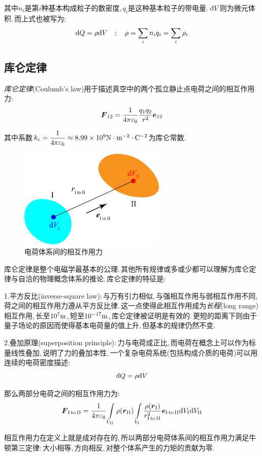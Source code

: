 其中\(n_i\)是第\(i\)种基本构成粒子的数密度,\,\(q_i\)是这种基本粒子的带电量.\,\(\textrm{d} V\)则为微元体积.\,而上式也被写为:
\[\textrm{d} Q=\rho \textrm{d} V\quad;\quad \rho=\sum_i{n_i q_i}=\sum_i \rho_i\]

\subsection{库仑定律}
\emph{库仑定律}(Coulumb's law)用于描述真空中的两个孤立静止点电荷之间的相互作用力:
\[\boldsymbol{F}_{12}=\frac{1}{4\pi\varepsilon_0}\frac{q_1q_2}{r^2}\boldsymbol{e}_{12}\]

其中系数\(k_e=\dfrac{1}{4\pi \varepsilon_0}\approx 8.99\times 10^{9}{\rm N\cdot m^{-2} \cdot C^{-2}}\)为库仑常数.

\begin{figure}
\centering
\includegraphics[width=7cm]{image/7-1-2.png}
\caption{电荷体系间的相互作用力}
\end{figure}
库仑定律是整个电磁学最基本的公理.\,其他所有规律或多或少都可以理解为库仑定律与自洽的物理概念体系的推论.\,库仑定律的特征是:

1.{\hei 平方反比(inverse-square law)}:\,与万有引力相似,\,与强相互作用与弱相互作用不同,\,荷之间的相互作用力遵从平方反比律.\,这一点使得此相互作用成为\emph{长程}(long range)相互作用,\,长至\(10^7{\rm m}\),\,短至\(10^{-17}{\rm m}\),\,库仑定律被证明是有效的.\,更短的距离下则由于量子场论的原因而使得基本电荷量的值上升,\,但基本的规律仍然不变.

2.{\hei 叠加原理(superposition principle)}:\,力与电荷成正比,\,而电荷在概念上可以作为标量线性叠加,\,说明了力的叠加本性.\,一个复杂电荷系统(包括构成介质的电荷)可以用连续的电荷密度描述:
\[\textrm{d} Q=\rho \textrm{d} V\]
	
那么两部分电荷之间的相互作用力为:
\[\boldsymbol{F}_{\rm I\,to\,II}=\frac{1}{4\pi\varepsilon_0}\int\limits_{V_{\rm II}}\rho(\boldsymbol{r}_{\rm II})\int\limits_{V_{\rm I}}\frac{\rho(\boldsymbol{r}_{\rm I})}{r_{\rm I\,to\,II}^2}\boldsymbol{e}_{\rm I\,to\,II}\textrm{d} V_{\rm I}\textrm{d} V_{\rm II}\]

相互作用力在定义上就是成对存在的,\,所以两部分电荷体系间的相互作用力满足牛顿第三定律:\,大小相等,\,方向相反,\,对整个体系产生的力矩的贡献为零.

